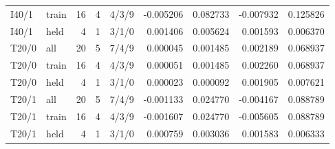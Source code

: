 \documentclass[10pt,a4paper]{article}
\begin{document}
{{\begin{longtable}{@{}llrrcrrrr@{}}
I40/1 & train & 16 & 4 & 4/3/9 & -0.005206 & 0.082733 & -0.007932 & 0.125826 \\
I40/1 & held & 4 & 1 & 3/1/0 & 0.001406 & 0.005624 & 0.001593 & 0.006370 \\
T20/0 & all & 20 & 5 & 7/4/9 & 0.000045 & 0.001485 & 0.002189 & 0.068937 \\
T20/0 & train & 16 & 4 & 4/3/9 & 0.000051 & 0.001485 & 0.002260 & 0.068937 \\
T20/0 & held & 4 & 1 & 3/1/0 & 0.000023 & 0.000092 & 0.001905 & 0.007621 \\
T20/1 & all & 20 & 5 & 7/4/9 & -0.001133 & 0.024770 & -0.004167 & 0.088789 \\
T20/1 & train & 16 & 4 & 4/3/9 & -0.001607 & 0.024770 & -0.005605 & 0.088789 \\
T20/1 & held & 4 & 1 & 3/1/0 & 0.000759 & 0.003036 & 0.001583 & 0.006333 \\
\end{longtable}
}

}
\end{document}
